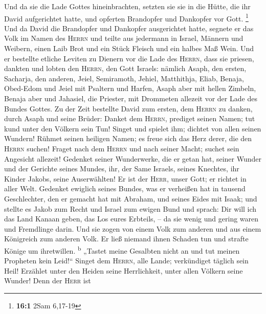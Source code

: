  Und da sie die Lade Gottes hineinbrachten, setzten sie
sie in die Hütte, die ihr David aufgerichtet hatte, und opferten
Brandopfer und Dankopfer vor Gott. \footnote{\textbf{16:1} 2Sam 6,17-19}
 Und da David die Brandopfer und Dankopfer ausgerichtet
hatte, segnete er das Volk im Namen des \textsc{Herrn} 
und teilte aus jedermann in Israel, Männern und Weibern, einen Laib Brot
und ein Stück Fleisch und ein halbes Maß Wein.  Und er
bestellte etliche Leviten zu Dienern vor die Lade des \textsc{Herrn},
dass sie priesen, dankten und lobten den \textsc{Herrn}, den Gott
Israels:  nämlich Asaph, den ersten, Sacharja, den
anderen, Jeiel, Semiramoth, Jehiel, Matthithja, Eliab, Benaja, Obed-Edom
und Jeiel mit Psaltern und Harfen, Asaph aber mit hellen Zimbeln,
 Benaja aber und Jahasiel, die Priester, mit Drommeten
allezeit vor der Lade des Bundes Gottes.  Zu der Zeit
bestellte David zum ersten, dem \textsc{Herrn} zu danken, durch Asaph
und seine Brüder:  Danket dem \textsc{Herrn}, prediget
seinen Namen; tut kund unter den Völkern sein Tun!  Singet
und spielet ihm; dichtet von allen seinen Wundern! 
Rühmet seinen heiligen Namen; es freue sich das Herz derer, die den
\textsc{Herrn} suchen!  Fraget nach dem \textsc{Herrn}
und nach seiner Macht; suchet sein Angesicht allezeit! 
Gedenket seiner Wunderwerke, die er getan hat, seiner Wunder und der
Gerichte seines Mundes,  ihr, der Same Israels, seines
Knechtes, ihr Kinder Jakobs, seine Auserwählten!  Er ist
der \textsc{Herr}, unser Gott; er richtet in aller Welt. 
Gedenket ewiglich seines Bundes, was er verheißen hat in tausend
Geschlechter,  den er gemacht hat mit Abraham, und seines
Eides mit Isaak;  und stellte es Jakob zum Recht und
Israel zum ewigen Bund  und sprach: Dir will ich das Land
Kanaan geben, das Los eures Erbteils, --  da sie wenig
und gering waren und Fremdlinge darin.  Und sie zogen von
einem Volk zum anderen und aus einem Königreich zum anderen Volk.
 Er ließ niemand ihnen Schaden tun und strafte Könige um
ihretwillen. \textsuperscript{b}  „Tastet meine Gesalbten
nicht an und tut meinen Propheten kein Leid!{}``  Singet
dem \textsc{Herrn}, alle Lande; verkündiget täglich sein Heil!
 Erzählet unter den Heiden seine Herrlichkeit, unter
allen Völkern seine Wunder!  Denn der \textsc{Herr} ist
